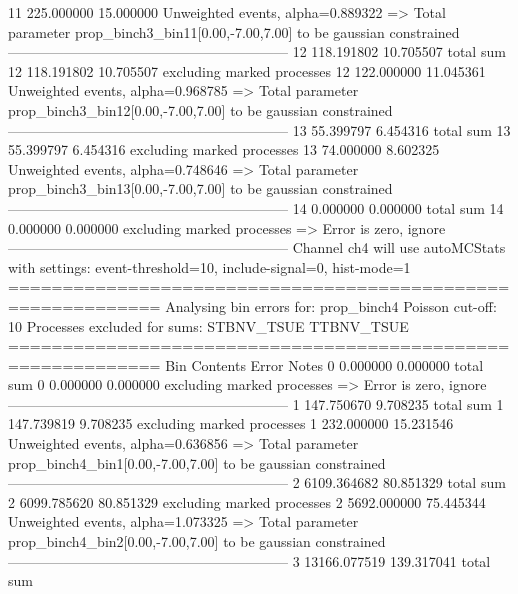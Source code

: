 11         225.000000      15.000000       Unweighted events, alpha=0.889322
  => Total parameter prop_binch3_bin11[0.00,-7.00,7.00] to be gaussian constrained
------------------------------------------------------------
12         118.191802      10.705507       total sum                     
12         118.191802      10.705507       excluding marked processes    
12         122.000000      11.045361       Unweighted events, alpha=0.968785
  => Total parameter prop_binch3_bin12[0.00,-7.00,7.00] to be gaussian constrained
------------------------------------------------------------
13         55.399797       6.454316        total sum                     
13         55.399797       6.454316        excluding marked processes    
13         74.000000       8.602325        Unweighted events, alpha=0.748646
  => Total parameter prop_binch3_bin13[0.00,-7.00,7.00] to be gaussian constrained
------------------------------------------------------------
14         0.000000        0.000000        total sum                     
14         0.000000        0.000000        excluding marked processes    
  => Error is zero, ignore      
------------------------------------------------------------
Channel ch4 will use autoMCStats with settings: event-threshold=10, include-signal=0, hist-mode=1
============================================================
Analysing bin errors for: prop_binch4
Poisson cut-off: 10
Processes excluded for sums: STBNV_TSUE TTBNV_TSUE
============================================================
Bin        Contents        Error           Notes                         
0          0.000000        0.000000        total sum                     
0          0.000000        0.000000        excluding marked processes    
  => Error is zero, ignore      
------------------------------------------------------------
1          147.750670      9.708235        total sum                     
1          147.739819      9.708235        excluding marked processes    
1          232.000000      15.231546       Unweighted events, alpha=0.636856
  => Total parameter prop_binch4_bin1[0.00,-7.00,7.00] to be gaussian constrained
------------------------------------------------------------
2          6109.364682     80.851329       total sum                     
2          6099.785620     80.851329       excluding marked processes    
2          5692.000000     75.445344       Unweighted events, alpha=1.073325
  => Total parameter prop_binch4_bin2[0.00,-7.00,7.00] to be gaussian constrained
------------------------------------------------------------
3          13166.077519    139.317041      total sum                     
